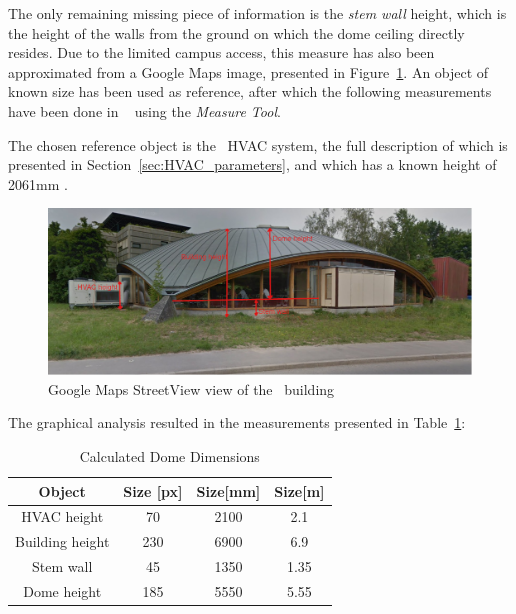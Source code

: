 The only remaining missing piece of information is the \textit{stem wall}
height, which is the height of the walls from the ground on which the dome
ceiling directly resides. Due to the limited campus access, this measure has
also been approximated from a Google Maps image, presented in
Figure~\ref{fig:Google_Maps_Streetview}. An object of known size has been used
as reference, after which the following measurements have been done in
~\cite{kimballGIMPGNUImage} using the
\textit{Measure Tool}.

The chosen reference object is the \pdome\ HVAC system, the full description of
which is presented in Section~\ref{sec:HVAC_parameters}, and which has a known
height of 2061mm \cite{aermecRoofTopManuelSelection}.

\begin{figure}[ht]
    \centering
    \includegraphics[width = \textwidth]{Images/polydome_streetview_annotated}
    \caption{Google Maps StreetView view of the \pdome\ building}
    \label{fig:Google_Maps_Streetview}
\end{figure}

The graphical analysis resulted in the measurements presented in
Table~\ref{tab:GIMP_measurements}:

\begin{table}[ht]
\centering
    \begin{tabular}{||c c c c||}
        \hline
        Object & Size [px] & Size[mm] & Size[m]\\
        \hline \hline
        HVAC height & 70 & 2100 & 2.1 \\
        Building height & 230 & 6900 & 6.9 \\
        Stem wall & 45 & 1350 & 1.35 \\
        Dome height & 185 & 5550 & 5.55 \\
        \hline
    \end{tabular}
\caption{Calculated Dome Dimensions}
\label{tab:GIMP_measurements}
\end{table}

